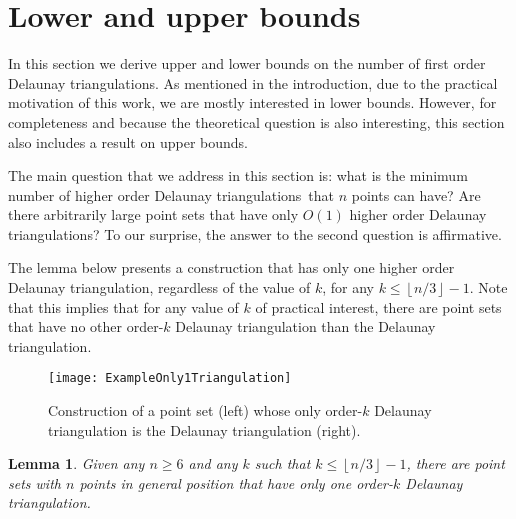\documentclass {journal}
\newtheorem {lemma} {Lemma}
\newcommand {\hodt}{higher order Delaunay triangulation}
\newcommand {\hodts}{higher order Delaunay triangulations}
\newcommand {\fodts}{first order Delaunay triangulations}
\begin{document}
\section{Lower and upper bounds}
\label{sec:bounds}

In this section we derive upper and lower bounds on the number of \fodts.
As mentioned in the introduction, due to the practical motivation of this work, we are mostly interested in lower bounds.
However, for completeness and because the theoretical question is also interesting, this section also includes a result on upper bounds.

The main question that we address in this section is: what is the minimum number of \hodts\ that $n$ points can have?
Are there arbitrarily large point sets that have only $O(1)$ \hodts?
To our surprise, the answer to the second question is affirmative.

The lemma below presents a construction that has only one \hodt, regardless of the value of $k$, for any $k \leq \left\lfloor n/3 \right\rfloor-1$.
Note that this implies that for any value of $k$ of practical interest, there are point sets that have no other order-$k$ Delaunay triangulation than the Delaunay triangulation.

\begin{figure}[tb]
\centering
\texttt{[image: ExampleOnly1Triangulation]}
\caption{Construction of a point set (left) whose only order-$k$ Delaunay triangulation is the Delaunay triangulation (right).}
\label{fig:ExampleOnly1Triangulation}
\end{figure}

\begin{lemma}
\label{lem:Only1}
Given any $n \geq 6$ and any $k$ such that $k \leq \left\lfloor n/3\right\rfloor-1$, there are point sets with $n$ points in general position that have only one order-$k$ Delaunay triangulation.
\end{lemma}
\end{document}
